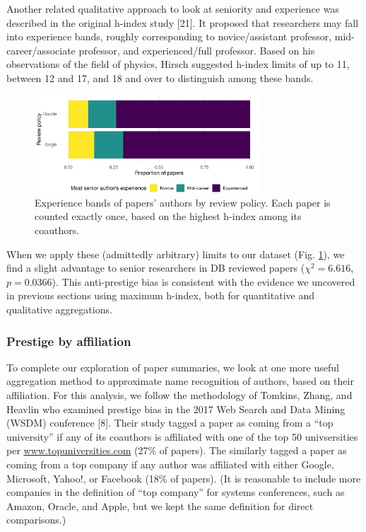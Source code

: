 \documentclass[12pt]{article}
\begin{document}
Another related qualitative approach to look at seniority and experience was described in the original h-index study {[}21{]}. It proposed that researchers may fall into experience bands, roughly corresponding to novice/assistant professor, mid-career/associate professor, and experienced/full professor. Based on his observations of the field of physics, Hirsch suggested h-index limits of up to 11, between 12 and 17, and 18 and over to distinguish among these bands.

\begin{figure}
\includegraphics[width=0.75\textwidth]{prestige_files/figure-latex/seniority-1} \caption{Experience bands of papers' authors by review policy. Each paper is counted exactly once, based on the highest h-index among its coauthors.}\label{fig:seniority}
\end{figure}

When we apply these (admittedly arbitrary) limits to our dataset (Fig. \ref{fig:seniority}), we find a slight advantage to senior researchers in DB reviewed papers
(\(\chi{}^2=6.616\), \(p=0.0366\)).
This anti-prestige bias is consistent with the evidence we uncovered in previous sections using maximum h-index, both for quantitative and qualitative aggregations.

\hypertarget{prestige-by-affiliation}{%
\subsubsection{Prestige by affiliation}\label{prestige-by-affiliation}}

To complete our exploration of paper summaries, we look at one more useful aggregation method to approximate name recognition of authors, based on their affiliation.
For this analysis, we follow the methodology of Tomkins, Zhang, and Heavlin who examined prestige bias in the 2017 Web Search and Data Mining (WSDM) conference {[}8{]}.
Their study tagged a paper as coming from a ``top university'' if any of its coauthors is affiliated with one of the top 50 univsersities per \url{www.topuniversities.com} (27\% of papers).
The similarly tagged a paper as coming from a top company if any author was affiliated with either Google, Microsoft, Yahoo!, or Facebook (18\% of papers).
(It is reasonable to include more companies in the definition of ``top company'' for systems conferences, such as Amazon, Oracle, and Apple, but we kept the same definition for direct comparisons.)
\end{document}
